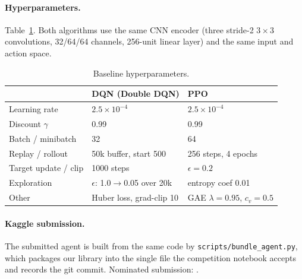 \paragraph{Hyperparameters.} Table~\ref{tab:hparams}. Both algorithms use the
same CNN encoder (three stride-2 $3\times3$ convolutions, 32/64/64 channels,
256-unit linear layer) and the same input and action space.

\begin{table}[h]
\centering\small
\caption{Baseline hyperparameters. }\label{tab:hparams}
\begin{tabular}{lll}
\toprule
 & DQN (Double DQN) & PPO \\
\midrule
Learning rate & $2.5\times10^{-4}$ & $2.5\times10^{-4}$ \\
Discount $\gamma$ & 0.99 & 0.99 \\
Batch / minibatch & 32 & 64 \\
Replay / rollout & 50k buffer, start 500 & 256 steps, 4 epochs \\
Target update / clip & 1000 steps & $\epsilon=0.2$ \\
Exploration & $\epsilon$: 1.0$\to$0.05 over 20k & entropy coef 0.01 \\
Other & Huber loss, grad-clip 10 & GAE $\lambda=0.95$, $c_v=0.5$ \\
\bottomrule
\end{tabular}
\end{table}

\paragraph{Kaggle submission.} The submitted agent is built from the same code
by \texttt{scripts/bundle\_agent.py}, which packages our library into the
single file the competition notebook accepts and records the git commit.
Nominated submission: .
